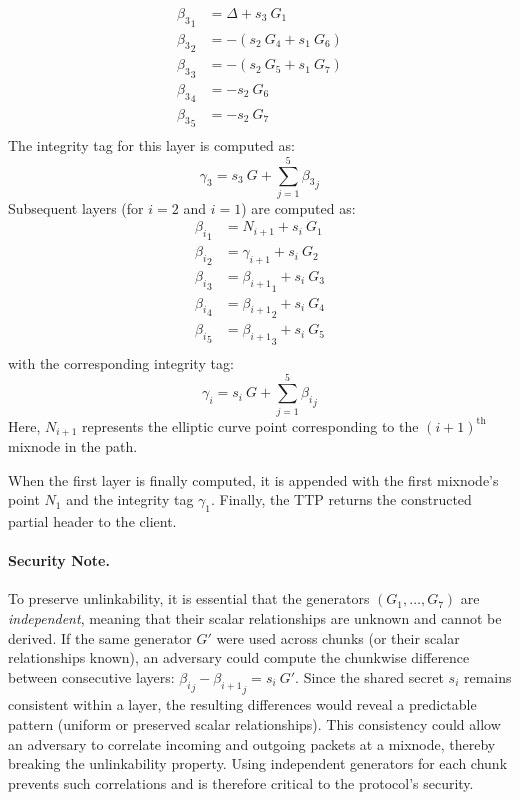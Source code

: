 \[
\begin{aligned}
    {\beta_3}_1 &= \Delta       + s_3 \ G_1 \\
    {\beta_3}_2 &= - (s_2 \ G_4 + s_1 \ G_6) \\
    {\beta_3}_3 &= - (s_2 \ G_5 + s_1 \ G_7) \\
    {\beta_3}_4 &= - s_2 \ G_6 \\
    {\beta_3}_5 &= - s_2 \ G_7 \\
\end{aligned}
\]
The integrity tag for this layer is computed as:
\[
\gamma_3 = s_3 \ G + \sum_{j=1}^{5} {\beta_3}_j
\]
Subsequent layers (for $ i = 2 $ and $ i = 1 $) are computed as:
\[
\begin{aligned}
    {\beta_i}_1 &= N_{i+1} + s_i \ G_1\\
    {\beta_i}_2 &= \gamma_{i+1} + s_i \ G_2 \\
    {\beta_i}_3 &= {\beta_{i+1}}_1 + s_i \ G_3 \\
    {\beta_i}_4 &= {\beta_{i+1}}_2 + s_i \ G_4 \\
    {\beta_i}_5 &= {\beta_{i+1}}_3 + s_i \ G_5 \\
\end{aligned}
\]
with the corresponding integrity tag:
\[
\gamma_i = s_i \ G + \sum_{j=1}^{5} {\beta_i}_j
\]
Here, $ N_{i+1} $ represents the elliptic curve point corresponding to the $ (i+1)^\text{th} $ mixnode in the path.

When the first layer is finally computed, it is appended with the first mixnode’s point $ N_1 $ and the integrity tag $ \gamma_1 $.
Finally, the TTP returns the constructed partial header to the client.

\paragraph{\textbf{Security Note.}}\label{note:security_why_indep_generators}
To preserve unlinkability, it is essential that the generators $ (G_1, \dots, G_7) $ are \textit{independent}, meaning that their scalar relationships are unknown and cannot be derived.
If the same generator $ G' $ were used across chunks (or their scalar relationships known), an adversary could compute the chunkwise difference between consecutive layers: $ {\beta_i}_j - {\beta_{i+1}}_j = s_i \ G' $.
Since the shared secret $ s_i $ remains consistent within a layer, the resulting differences would reveal a predictable pattern (uniform or preserved scalar relationships).
This consistency could allow an adversary to correlate incoming and outgoing packets at a mixnode, thereby breaking the unlinkability property.
Using independent generators for each chunk prevents such correlations and is therefore critical to the protocol's security.  
  

